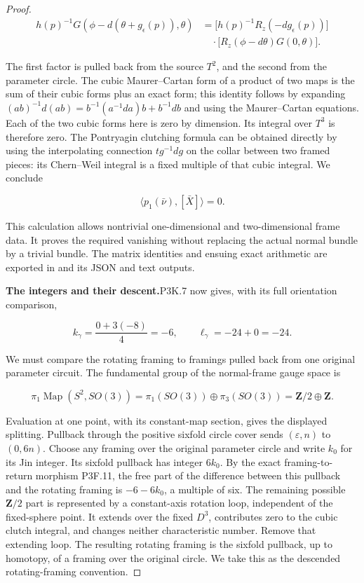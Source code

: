 \begin{proof}
\[
\begin{aligned}
 h(p)^{-1}G(\phi-d(\theta+g_\epsilon(p)),\theta)
 &=\bigl[h(p)^{-1}R_z(-d g_\epsilon(p))\bigr]\\
 &\quad\cdot\bigl[R_z(\phi-d\theta)G(0,\theta)\bigr].
\end{aligned}
\]

The first factor is pulled back from the source \(T^2\), and the
second from the parameter circle.  The cubic Maurer--Cartan form
of a product of two maps is the sum of their cubic forms plus an
exact form; this identity follows by expanding
\((ab)^{-1}d(ab)=b^{-1}(a^{-1}da)b+b^{-1}db\) and using the
Maurer--Cartan equations.  Each of the two cubic forms here is
zero by dimension.  Its integral over \(T^3\) is therefore zero.
The Pontryagin clutching formula can be obtained directly by using
the interpolating connection \(t g^{-1}dg\) on the collar between
two framed pieces: its Chern--Weil integral is a fixed multiple
of that cubic integral.  We conclude

\[
 \langle p_1(\bar\nu),[\bar X]\rangle=0.
\]

This calculation allows nontrivial one-dimensional and
two-dimensional frame data.  It proves the required vanishing
without replacing the actual normal bundle by a trivial bundle.
The matrix identities and ensuing exact arithmetic are exported
in  and its JSON and text outputs.

\par\medskip\noindent\textbf{The integers and their descent.}\enspace P3K.7 now gives, with
its full orientation comparison,

\[
 k_{\gamma}=\frac{0+3(-8)}4=-6,
 \qquad \ell_{\gamma}=-24+0=-24.
\]

We must compare the rotating framing to framings pulled back from
one original parameter circuit.  The fundamental group of the
normal-frame gauge space is

\[
 \pi_1\operatorname{Map}(S^2,SO(3))
 =\pi_1(SO(3))\oplus\pi_3(SO(3))
 =\mathbf Z/2\oplus\mathbf Z.
\]

Evaluation at one point, with its constant-map section, gives the
displayed splitting.  Pullback through the positive sixfold circle
cover sends \((\varepsilon,n)\) to \((0,6n)\).  Choose any
framing over the original parameter circle and write \(k_0\) for
its Jin integer.  Its sixfold pullback has integer \(6k_0\).
By the exact framing-to-return morphism P3F.11, the free part of
the difference between this pullback and the rotating framing is
\(-6-6k_0\), a multiple of six.  The remaining possible
\(\mathbf Z/2\) part is represented by a constant-axis rotation
loop, independent of the fixed-sphere point.  It extends over the
fixed \(D^3\), contributes zero to the cubic clutch integral, and
changes neither characteristic number.  Remove that extending
loop.  The resulting rotating framing is the sixfold pullback,
up to homotopy, of a framing over the original circle.  We take
this as the descended rotating-framing convention.


\end{proof}
